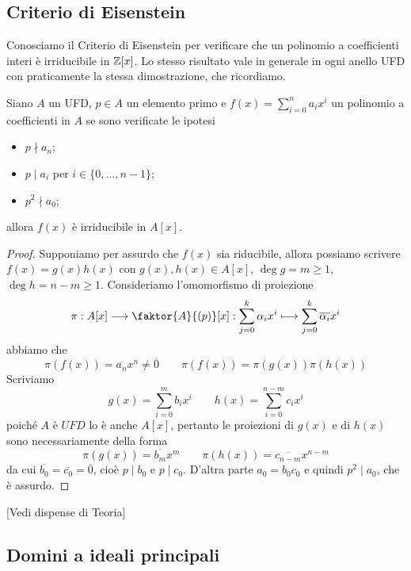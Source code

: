 \documentclass[11pt]{scrartcl}
\begin{document}
\newpage

\subsection{Criterio di Eisenstein}

Conosciamo il Criterio di Eisenstein per verificare che un polinomio a coefficienti
interi è irriducibile in $\mathbb Z[x]$. Lo stesso risultato vale in generale in 
ogni anello UFD con praticamente la stessa dimostrazione, che ricordiamo.

\begin{proposition}
    Siano $A$ un UFD, $p \in A$ un elemento primo e $f(x) = \displaystyle\sum_{i = 0}^n a_ix^i$
    un polinomio a coefficienti in $A$ se sono verificate le ipotesi
    \begin{itemize}
        \item $p \nmid a_n$;
        \item $p \mid a_i$ per $i \in \{0, \ldots, n - 1\}$;
        \item $p^2 \nmid a_0$;
    \end{itemize}
    allora $f(x)$ è irriducibile in $A[x]$.
\end{proposition}

\begin{proof}
    Supponiamo per assurdo che $f(x)$ sia riducibile, allora possiamo scrivere $f(x) = g(x)h(x)$
    con $g(x), h(x) \in A[x]$, $\deg g = m \geq 1$, $\deg h = n - m \geq 1$. 
    Consideriamo l'omomorfismo di proiezione
    \[
        \pi: A[x] \longrightarrow \faktor{A}{(p)}[x]: 
        \sum_{j = 0}^k\alpha_ix^i \longmapsto \sum_{j = 0}^k \overline{\alpha_i}x^i
    \]
    abbiamo che 
    \[
        \pi(f(x)) = \overline{a_n}x^n \neq \overline{0} \qquad\pi(f(x)) = \pi(g(x))\pi(h(x))
    \]
    Scriviamo 
    \[
        g(x) = \sum_{i = 0}^m b_ix^i\qquad h(x) = \sum_{i = 0}^{n - m}c_ix^i
    \]
    poiché $A$ è $UFD$ lo è anche $A[x]$, pertanto le proiezioni di $g(x)$
    e di $h(x)$ sono necessariamente della forma
    \[
        \pi(g(x)) = \overline{b_m}x^m\qquad \pi(h(x)) = \overline{c_{n - m}}x^{n - m}
    \]
    da cui $\overline{b_0} = \overline{c_0} = \overline{0}$, cioè $p \mid b_0$ e
    $p \mid c_0$. D'altra parte $a_0 = b_0c_0$ e quindi $p^2 \mid a_0$, che 
    è assurdo.
\end{proof}
[Vedi dispense di Teoria]

\newpage

\subsection{Domini a ideali principali}
\end{document}
